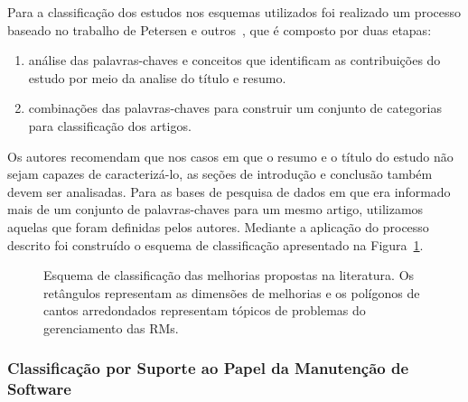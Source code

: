 Para a classificação dos estudos nos esquemas utilizados foi realizado um
processo baseado no trabalho de Petersen e outros~\cite{Petersen2008}, que é
composto por duas etapas:

\begin{enumerate}[I]
	\item análise das palavras-chaves e conceitos que
		identificam as contribuições do estudo por meio da analise do título e
		resumo.
	\item combinações das palavras-chaves para construir um conjunto de
		categorias para classificação dos artigos.
\end{enumerate}

Os autores recomendam que nos casos em que o resumo e o título do estudo não
sejam capazes de caracterizá-lo, as seções de introdução e conclusão também
devem ser analisadas. Para as bases de pesquisa de dados em que era informado
mais de um conjunto de palavras-chaves para um mesmo artigo, utilizamos aquelas
que foram definidas pelos autores. Mediante a aplicação do processo descrito foi
construído o esquema de classificação apresentado na
Figura~\ref{fig:diagrama-esquema-dimensao-melhorias}.

\begin{figure}[tb] \centering
    \caption{Esquema de classificação das melhorias propostas na literatura. Os
        retângulos representam as dimensões de melhorias e os polígonos de
        cantos arredondados representam tópicos de problemas do gerenciamento
        das RMs.}
\label{fig:diagrama-esquema-dimensao-melhorias}
\end{figure}

\subsubsection{Classificação por Suporte ao Papel da Manutenção de Software}
\label{subsubsec:map-esquema-suporte-papel-man}

